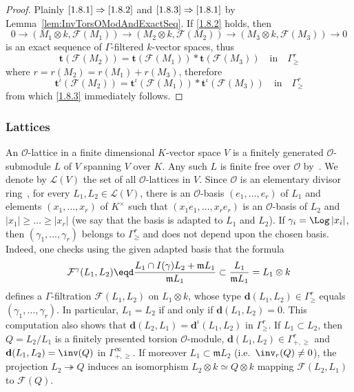 \begin{proof}
Plainly $\eqref{1.8.1}\Rightarrow\eqref{1.8.2}$ and $\eqref{1.8.3}\Rightarrow\eqref{1.8.1}$ by Lemma~\ref{lem:InvTorsOModAndExactSeq}. If \eqref{1.8.2} holds, then
\[
0\rightarrow\left(M_{1}\otimes k,\mathcal{F}(M_{1})\right)\rightarrow\left(M_{2}\otimes k,\mathcal{F}(M_{2})\right)\rightarrow\left(M_{3}\otimes k,\mathcal{F}(M_{3})\right)\rightarrow0
\]
is an exact sequence of $\Gamma$-filtered $k$-vector spaces, thus
\[
\mathbf{t}(\mathcal{F}(M_{2}))=\mathbf{t}(\mathcal{F}(M_{1}))\ast\mathbf{t}(\mathcal{F}(M_{3}))\quad\text{in}\quad\Gamma_{\geq}^{r}
\]
where $r=r(M_{2})=r(M_{1})+r(M_{3})$, therefore
\[
\mathbf{t}^{\iota}(\mathcal{F}(M_{2}))=\mathbf{t}^{\iota}(\mathcal{F}(M_{1}))\ast\mathbf{t}^{\iota}(\mathcal{F}(M_{3}))\quad\text{in}\quad\Gamma_{\geq}^{r}
\]
from which \eqref{1.8.3} immediately follows.
\end{proof}

\subsubsection{Lattices}\label{subsec:Lattices}

An $\mathcal{O}$-lattice in a finite dimensional $K$-vector space $V$ is a finitely generated $\mathcal{O}$-submodule $L$ of $V$ spanning $V$ over $K$. Any such $L$ is finite free over $\mathcal{O}$ by~\cite[VI, \S 3, 6, Lemme~1]{BoAC56}. We denote by $\mathcal{L}(V)$ the set of all $\mathcal{O}$-lattices in $V$. Since $\mathcal{O}$ is an elementary divisor ring~\cite[\S 10]{Ka66}, for every $L_{1},L_{2}\in\mathcal{L}(V)$, there is an $\mathcal{O}$-basis $(e_{1},\dots,e_{r})$ of $L_{1}$ and elements $(x_{1},\dots,x_{r})$ of $K^{\times}$ such that $(x_{1}e_{1},\dots,x_{r}e_{r})$ is an $\mathcal{O}$-basis of $L_{2}$ and $\left|x_{1}\right|\geq\dots\geq\left|x_{r}\right|$ (we say that the basis is adapted to $L_{1}$ and $L_{2}$). If $\gamma_{i}=\Log\left|x_{i}\right|$, then $(\gamma_{1},\dots,\gamma_{r})$ belongs to $\Gamma_{\geq}^{r}$ and does not depend upon the chosen basis. Indeed, one checks using the given adapted basis that the formula
\[
\mathcal{F}^{\gamma}(L_{1},L_{2})\eqd\frac{L_{1}\cap I(\gamma)L_{2}+\mathfrak{m}L_{1}}{\mathfrak{m}L_{1}}\subset\frac{L_{1}}{\mathfrak{m}L_{1}}=L_{1}\otimes k
\]
defines a $\Gamma$-filtration $\mathcal{F}(L_{1},L_{2})$ on $L_{1}\otimes k$, whose type $\mathbf{d}(L_{1},L_{2})\in\Gamma_{\geq}^{r}$ equals $(\gamma_{1},\dots,\gamma_{r})$. In particular, $L_{1}=L_{2}$ if and only if $\mathbf{d}(L_{1},L_{2})=0$. This computation also shows that $\mathbf{d}(L_{2},L_{1})=\mathbf{d}^{\iota}(L_{1},L_{2})$ in $\Gamma_{\geq}^{r}$. If $L_{1}\subset L_{2}$, then $Q=L_{2}/L_{1}$ is a finitely presented torsion $\mathcal{O}$-module, $\mathbf{d}(L_{1},L_{2})\in\Gamma_{+,\geq}^{r}$ and $\mathbf{d}(L_{1},L_{2})=\inv(Q)$ in $\Gamma_{+,\geq}^{\infty}$. If moreover $L_{1}\subset\mathfrak{m}L_{2}$ (i.e.~$\inv_{r}(Q)\neq0$), the projection $L_{2}\twoheadrightarrow Q$ induces an isomorphism $L_{2}\otimes k\simeq Q\otimes k$ mapping $\mathcal{F}(L_{2},L_{1})$ to $\mathcal{F}(Q)$.

